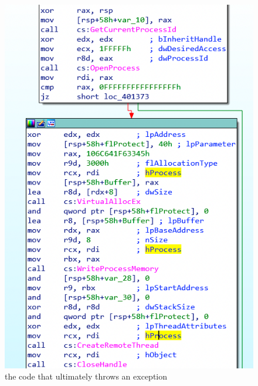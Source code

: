 \begin{figure}[!htbp]
\centering
\includegraphics[width=\linewidth]{media/crash_code.png}
\caption{the code that ultimately throws an exception}\label{crash_code}
\end{figure}
